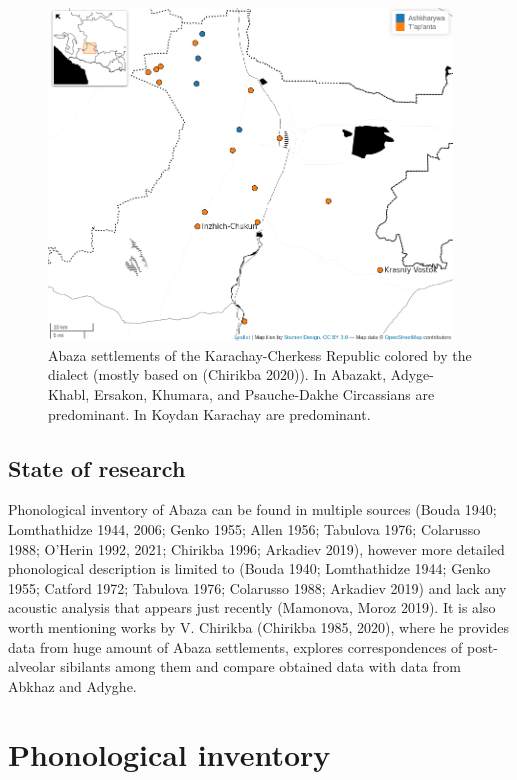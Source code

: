 \documentclass[
]{article}
\begin{document}
\begin{figure}

{\centering \includegraphics[width=4.22in]{images/01_abaza_map} 

}

\caption{Abaza settlements of the Karachay-Cherkess Republic colored by the dialect (mostly based on (Chirikba 2020)). In Abazakt, Adyge-Khabl, Ersakon, Khumara, and Psauche-Dakhe Circassians are predominant. In Koydan Karachay are predominant.}\label{fig:abaza-map}
\end{figure}

\hypertarget{state-of-research}{%
\subsection{State of research}\label{state-of-research}}

Phonological inventory of Abaza can be found in multiple sources (Bouda
1940; Lomthathidze 1944, 2006; Genko 1955; Allen 1956; Tabulova 1976;
Colarusso 1988; O'Herin 1992, 2021; Chirikba 1996; Arkadiev 2019),
however more detailed phonological description is limited to (Bouda
1940; Lomthathidze 1944; Genko 1955; Catford 1972; Tabulova 1976;
Colarusso 1988; Arkadiev 2019) and lack any acoustic analysis that
appears just recently (Mamonova, Moroz 2019). It is also worth
mentioning works by V. Chirikba (Chirikba 1985, 2020), where he provides
data from huge amount of Abaza settlements, explores correspondences of
post-alveolar sibilants among them and compare obtained data with data
from Abkhaz and Adyghe.

\hypertarget{phonological-inventory}{%
\section{Phonological inventory}\label{phonological-inventory}}
\end{document}
